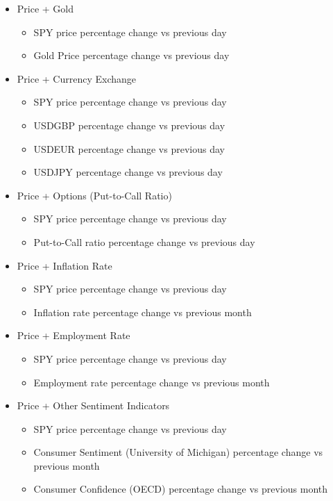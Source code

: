 \begin{itemize}
    \item Price + Gold
    \begin{itemize}
        \item SPY price percentage change vs previous day
        \item Gold Price percentage change vs previous day
    \end{itemize}
    \item Price + Currency Exchange
    \begin{itemize}
        \item SPY price percentage change vs previous day
        \item USDGBP percentage change vs previous day
        \item USDEUR percentage change vs previous day
        \item USDJPY percentage change vs previous day
    \end{itemize}
    \item Price + Options (Put-to-Call Ratio)
    \begin{itemize}
        \item SPY price percentage change vs previous day
        \item Put-to-Call ratio percentage change vs previous day
    \end{itemize}
    \item Price + Inflation Rate
    \begin{itemize}
        \item SPY price percentage change vs previous day
        \item Inflation rate percentage change vs previous month
    \end{itemize}
    \item Price + Employment Rate
    \begin{itemize}
        \item SPY price percentage change vs previous day
        \item Employment rate percentage change vs previous month
    \end{itemize}
    \item Price + Other Sentiment Indicators
    \begin{itemize}
        \item SPY price percentage change vs previous day
        \item Consumer Sentiment (University of Michigan) percentage change vs previous month
        \item Consumer Confidence (OECD) percentage change vs previous month
    \end{itemize}
\end{itemize}

